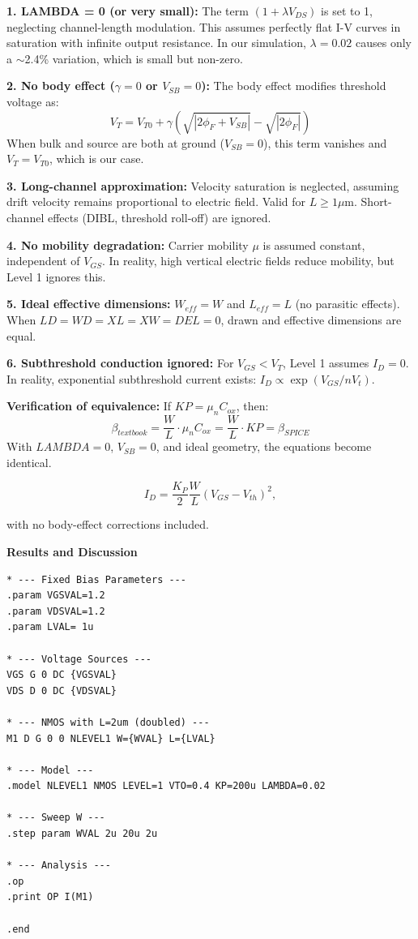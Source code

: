 \documentclass[a4paper,12pt]{article}
\begin{document}
\textbf{1. LAMBDA = 0 (or very small):}
The term $(1 + \lambda V_{DS})$ is set to 1, neglecting channel-length modulation. This assumes perfectly flat I-V curves in saturation with infinite output resistance. In our simulation, $\lambda = 0.02$ causes only a $\sim$2.4\% variation, which is small but non-zero.

\textbf{2. No body effect ($\gamma = 0$ or $V_{SB} = 0$):}
The body effect modifies threshold voltage as:
\begin{equation}
V_T = V_{T0} + \gamma(\sqrt{|2\phi_F + V_{SB}|} - \sqrt{|2\phi_F|})
\end{equation}
When bulk and source are both at ground ($V_{SB} = 0$), this term vanishes and $V_T = V_{T0}$, which is our case.

\textbf{3. Long-channel approximation:}
Velocity saturation is neglected, assuming drift velocity remains proportional to electric field. Valid for $L \geq 1\mu$m. Short-channel effects (DIBL, threshold roll-off) are ignored.

\textbf{4. No mobility degradation:}
Carrier mobility $\mu$ is assumed constant, independent of $V_{GS}$. In reality, high vertical electric fields reduce mobility, but Level 1 ignores this.

\textbf{5. Ideal effective dimensions:}
$W_{eff} = W$ and $L_{eff} = L$ (no parasitic effects). When $LD = WD = XL = XW = DEL = 0$, drawn and effective dimensions are equal.

\textbf{6. Subthreshold conduction ignored:}
For $V_{GS} < V_T$, Level 1 assumes $I_D = 0$. In reality, exponential subthreshold current exists: $I_D \propto \exp(V_{GS}/nV_t)$.

\textbf{Verification of equivalence:}
If $KP = \mu_n C_{ox}$, then:
\begin{equation}
\beta_{textbook} = \frac{W}{L} \cdot \mu_n C_{ox} = \frac{W}{L} \cdot KP = \beta_{SPICE}
\end{equation}
With $LAMBDA = 0$, $V_{SB} = 0$, and ideal geometry, the equations become identical.

\begin{equation}
I_D = \frac{K_P}{2} \frac{W}{L}(V_{GS} - V_{th})^2,
\end{equation}

with no body-effect corrections included.

\textbf{Results and Discussion}

\begin{lstlisting}[caption=Beta Sweep Simulation Code, label=lst:beta_sweep]
* --- Fixed Bias Parameters ---
.param VGSVAL=1.2
.param VDSVAL=1.2
.param LVAL= 1u

* --- Voltage Sources ---
VGS G 0 DC {VGSVAL}
VDS D 0 DC {VDSVAL}

* --- NMOS with L=2um (doubled) ---
M1 D G 0 0 NLEVEL1 W={WVAL} L={LVAL}

* --- Model ---
.model NLEVEL1 NMOS LEVEL=1 VTO=0.4 KP=200u LAMBDA=0.02

* --- Sweep W ---
.step param WVAL 2u 20u 2u

* --- Analysis ---
.op
.print OP I(M1)

.end
\end{lstlisting}
\end{document}
